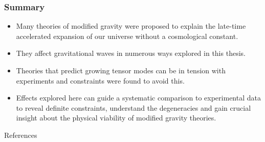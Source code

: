 \documentclass[aspectratio=1610]{beamer}
\begin{document}
\begin{frame}
\frametitle{Summary}
\begin{itemize}
	\item Many theories of modified gravity were proposed to explain the late-time accelerated expansion of our universe without a cosmological constant.
	\item They affect gravitational waves in numerous ways explored in this thesis.
	\item Theories that predict growing tensor modes can be in tension with experiments and constraints were found to avoid this.
	\item Effects explored here can guide a systematic comparison to experimental data to reveal definite constraints, understand the degeneracies and gain crucial insight about the physical viability of modified gravity theories.
\end{itemize}
\end{frame}



\begin{frame}{References}
\printbibliography
\end{frame}
\end{document}
